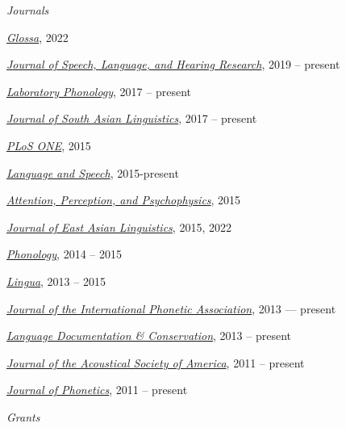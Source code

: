 \documentclass[10pt]{article}
\begin{document}
\begin{outerlist}

    \item[] \textit{Journals}%

      \begin{innerlist}
      \item
        \href{https://www.glossa-journal.org/}{\emph{Glossa}}, 2022
      \item
        \href{http://www.journal-labphon.org/}{\emph{Journal of Speech, Language, and Hearing Research}}, 2019 -- present
      \item
        \href{http://www.journal-labphon.org/}{\emph{Laboratory Phonology}}, 2017 -- present
      \item
        \href{http://jsal-journal.org/}{\emph{Journal of South Asian Linguistics}}, 2017 -- present
      \item
        \href{http://www.plosone.org/}{\emph{PLoS ONE}}, 2015
      \item
        \href{http://las.sagepub.com}{\emph{Language
            and Speech}}, 2015-present
      \item
        \href{http://www.springer.com/psychology/cognitive+psychology/journal/13414}{\emph{Attention,
            Perception, and Psychophysics}}, 2015
      \item
        \href{http://link.springer.com/journal/10831}{\emph{Journal of East Asian Linguistics}},
        2015, 2022
      \item
        \href{http://journals.cambridge.org/action/displayJournal?jid=PHO}{\emph{Phonology}},
        2014 -- 2015
      \item \href{http://www.journals.elsevier.com/lingua/}{\emph{Lingua}}, 2013 -- 2015
        \item
          \href{http://journals.cambridge.org/action/displayJournal?jid=IPA}{\emph{Journal
              of the International Phonetic Association}}, 2013 --- present
        \item \href{http://nflrc.hawaii.edu/ldc/}{\emph{Language Documentation \& Conservation}}, 2013 -- present
        \item \href{http://asadl.org/jasa/}{\emph{Journal of the Acoustical Society of America}}, 2011 -- present
        \item \href{http://www.journals.elsevier.com/journal-of-phonetics/}{\emph{Journal of Phonetics}}, 2011 -- present
      \end{innerlist}

    \item[] \textit{Grants}%


\end{outerlist}
\end{document}
